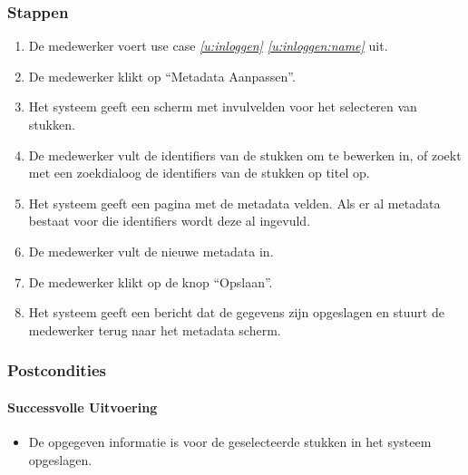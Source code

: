 \documentclass[a4paper,titlepage]{report}
\def\namedref#1{\ref{#1} \ref{#1:name}}
\begin{document}
      \subsubsection{Stappen}
        \begin{enumerate}
          \item De medewerker voert use case \textit{\namedref{u:inloggen}}
            uit.
          \item De medewerker klikt op ``Metadata Aanpassen''.
          \item\label{u:metadata-aanpassen:scherm}
            Het systeem geeft een scherm met invulvelden voor het selecteren
            van stukken.
          \item De medewerker vult de identifiers van de stukken om te
            bewerken in, of zoekt met een zoekdialoog de identifiers van de
            stukken op titel op.
          \item Het systeem geeft een pagina met de metadata velden. Als er al
          metadata bestaat voor die identifiers wordt deze al ingevuld.
          \item\label{u:metadata-aanpassen:invullen}
            De medewerker vult de nieuwe metadata in.
          \item De medewerker klikt op de knop ``Opslaan''.
          \item Het systeem geeft een bericht dat de gegevens zijn opgeslagen
          en stuurt de medewerker terug naar het metadata scherm.
        \end{enumerate}
      \subsubsection{Postcondities}
        \paragraph{Successvolle Uitvoering}
          \begin{itemize}
            \item De opgegeven informatie is voor de geselecteerde stukken in
              het systeem opgeslagen.
          \end{itemize}
\end{document}
